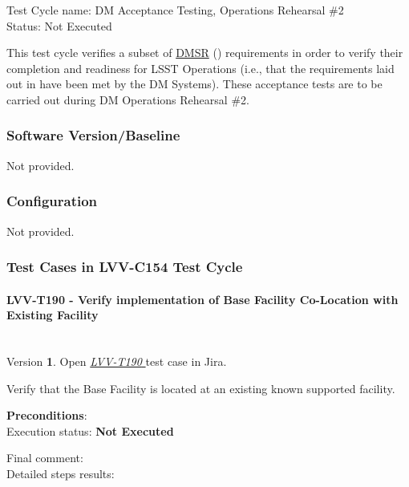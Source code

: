 \documentclass[DM,lsstdraft,STR,toc]{lsstdoc}
\begin{document}
Test Cycle name: DM Acceptance Testing, Operations Rehearsal \#2\\
Status: Not Executed

This test cycle verifies a subset of
\href{https://lse-61.lsst.io/}{DMSR} () requirements in order to
verify their completion and readiness for LSST Operations (i.e., that
the requirements laid out in  have been met by the DM Systems).
These acceptance tests are to be carried out during DM Operations
Rehearsal \#2.

\subsubsection{Software Version/Baseline}
Not provided.

\subsubsection{Configuration}
Not provided.

\subsubsection{Test Cases in LVV-C154 Test Cycle}

\paragraph{ LVV-T190 - Verify implementation of Base Facility Co-Location with Existing
Facility }\mbox{}\\

Version \textbf{1}.
Open  \href{https://jira.lsstcorp.org/secure/Tests.jspa#/testCase/LVV-T190}{\textit{ LVV-T190 } }
test case in Jira.

Verify that the Base Facility is located at an existing known supported
facility.

\textbf{ Preconditions}:\\


Execution status: {\bf Not Executed }

Final comment:\\


Detailed steps results:
\end{document}
